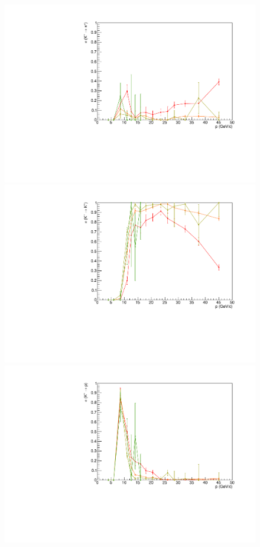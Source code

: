 \begin{figure}[!p]
  \centering
	\includegraphics[scale=0.35]{./gfx/Kp_pi.pdf}
  \includegraphics[scale=0.35]{./gfx/Kp_K.pdf}
  \includegraphics[scale=0.35]{./gfx/Kp_p.pdf}

\end{figure}
